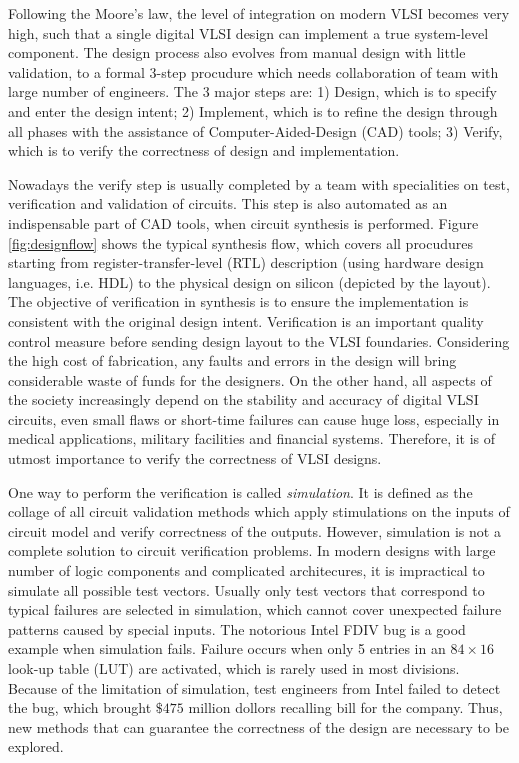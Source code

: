 Following the Moore's law, the level of integration on modern VLSI becomes very high, 
such that a single digital VLSI design can implement a true system-level component.
The design process also evolves from manual design with little validation, to 
a formal 3-step procudure which needs collaboration of team with large number of 
engineers. The 3 major steps are: 1) Design, which is to specify and enter the design intent;
2) Implement, which is to refine the design through all phases with the assistance of Computer-Aided-Design (CAD)
tools; 3) Verify, which is to verify the correctness of design and implementation.

Nowadays the verify step is usually completed by a team with specialities on test, verification and validation of 
circuits. This step is also automated as an indispensable part of CAD tools, when circuit synthesis is performed. 
Figure \ref{fig:designflow} shows the typical synthesis flow, which covers all procudures starting from 
register-transfer-level (RTL) description (using hardware design languages, i.e. HDL) to  the 
physical design on silicon (depicted by the layout). The objective of verification in synthesis is 
to ensure the implementation is consistent with the original design intent. Verification is 
an important quality control measure before sending design layout to the VLSI foundaries.
Considering the high cost of fabrication, any faults and errors in the design will bring considerable 
waste of funds for the designers. On the other hand, all aspects of the society increasingly depend on 
the stability and accuracy of digital VLSI circuits, even small flaws or short-time failures can cause 
huge loss, especially in medical applications, military facilities and financial systems.
Therefore, it is of utmost importance to verify the correctness of VLSI designs.

One way to perform the verification is called {\it simulation}. It is defined as the collage of all circuit validation 
methods which apply stimulations on the inputs of circuit model and verify correctness of the outputs.
However, simulation is not a complete solution to circuit verification problems. In modern designs with 
large number of logic components and complicated architecures, it is impractical to simulate all possible 
test vectors. Usually only test vectors that correspond to typical failures are selected in simulation, which 
cannot cover unexpected failure patterns caused by special inputs. The notorious Intel FDIV bug \cite{nicely:FDIV}
is a good example when simulation fails. Failure occurs when only 5 entries in an $84\times 16$ look-up table
(LUT) are activated,  which is rarely used in most divisions. Because of the limitation of simulation,  
test engineers from Intel failed to detect the bug,  which brought $\$475$ million dollors recalling bill
for the company. Thus,  new methods that can guarantee the correctness of the design are necessary to be explored.

